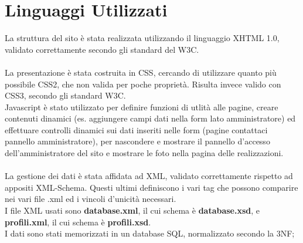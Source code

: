 \section{Linguaggi Utilizzati}{
	La struttura del sito è stata realizzata utilizzando il linguaggio XHTML 1.0, validato correttamente secondo gli standard del W3C. \\
	\\
	La presentazione è stata costruita in CSS, cercando di utilizzare quanto più possibile CSS2, che non valida per poche proprietà. Risulta invece valido con CSS3, secondo gli standard W3C.
	\\
	Javascript è stato utilizzato per definire funzioni di utlità alle pagine, creare contenuti dinamici (es. aggiungere campi dati nella form lato amministratore) ed effettuare controlli dinamici sui dati inseriti nelle form (pagine contattaci pannello amministratore), per nascondere e mostrare il pannello d'accesso dell'amministratore del sito e mostrare le foto nella pagina delle realizzazioni.\\
	\\
	La gestione dei dati è stata affidata ad XML, validato correttamente rispetto ad appositi XML-Schema. Questi ultimi definiscono i vari tag che possono comparire nei vari file .xml ed i vincoli d'unicità necessari. \\
	I file XML usati sono \textbf{database.xml}, il cui schema è \textbf{database.xsd}, e \textbf{profili.xml}, il cui schema è \textbf{profili.xsd}.\\
	
	I dati sono stati memorizzati in un database SQL, normalizzato secondo la 3NF; 
	
}
